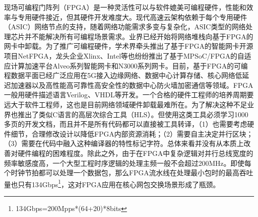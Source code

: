 现场可编程门阵列（FPGA）是一种灵活性可以与软件媲美可编程硬件，性能和效率与专用硬件接近，但其硬件开发难度大。现代高速云架构依赖于每个专用硬件（ASIC）网络节点的支持，随着网络功能需求多变与复杂化，ASIC类型的网络处理芯片并不能解决所有可编程场景需求。业界已经开始将网络堆栈向基于FPGA的网卡中卸载。为了推广可编程硬件，学术界牵头推出了基于FPGA的智能网卡开源项目NetFPGA，龙头企业Xlinx、Intel等也纷纷推出了基于MPSoC/FPGA的自适应计算加速平台Alveo系列智能网卡和N3000系列网卡。目前，基于FPGA的可编程数据平面已经广泛应用在5G接入边缘网络、数据中心计算存储、核心网络低延迟加速器以及高性能高可靠性高安全性的数据中心防火墙加密通信等领域。FPGA一般用硬件描述语言Verilog、VHDL等开发。一个合格的硬件工程师的培养周期要远大于软件工程师，这也是目前网络领域硬件卸载最难所在。为了解决这种不足业界也推出了类似C语言的高层次综合工具（HLS）。但使用这类工具必须学习1000多页的开发文档，而且并不是所有代码都可以直接被工具转译，（1）也需要考虑硬件细节，合理修改设计以降低FPGA内部资源消耗；（2）需要自主决定并行区块；（3）需要在代码中融入这种编译器的特性标记字符。总体来看并没有从本质上改善对硬件编程的困难程度。除此之外，由于在FPGA中复杂逻辑对并行总线宽度的频率敏感度高，一个大型工程时序逻辑的处理主频一般不会超过200MHz。即使每个时钟节拍都可以处理一个数据包，那么FPGA流水线在处理最小包时的最高吞吐量也只有134Gbps\footnote{134Gbps=200Mpps*(64+20)*8bits}，这对FPGA应用在核心网包交换场景形成了瓶颈。




